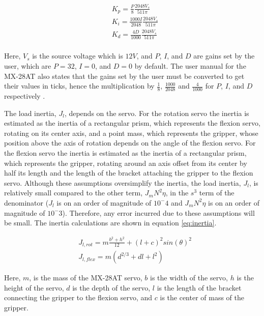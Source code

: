 \documentclass[letterpaper,12pt]{article}
\begin{document}
\begin{equation}
\begin{split}
	\label{eq:internal_gains_conversion}
	& K_p = \frac{P}{8} \frac{2048 V_s}{511 \pi} \\
	& K_i = \frac{1000 I}{2048} \frac{2048 V_s}{511 \pi} \\
	& K_d = \frac{4 D}{1000} \frac{2048 V_s}{511 \pi} \\
\end{split}
\end{equation}

Here, $V_s$ is the source voltage which is $12 V$, and $P$, $I$, and $D$ are gains set by the user, which are $P=32$, $I=0$, and $D=0$ by default. The user manual for the MX-28AT also states that the gains set by the user must be converted to get their values in ticks, hence the multiplication by $\frac{1}{8}$, $\frac{1000}{2048}$ and $\frac{4}{1000}$ for $P$, $I$, and $D$ respectively \cite{robotis}.

The load inertia, $J_l$, depends on the servo. For the rotation servo the inertia is estimated as the inertia of a rectangular prism, which represents the flexion servo, rotating on its center axis, and a point mass, which represents the gripper, whose position above the axis of rotation depends on the angle of the flexion servo. For the flexion servo the inertia is estimated as the inertia of a rectangular prism, which represents the gripper, rotating around an axis offset from its center by half its length and the length of the bracket attaching the gripper to the flexion servo. Although these assumptions oversimplify the inertia, the load inertia, $J_l$, is relatively small compared to the other term, $J_mN^2\eta$, in the $s^3$ term of the denominator ($J_l$ is on an order of magnitude of $10^-4$ and $J_mN^2\eta$ is on an order of magnitude of $10^-3$). Therefore, any error incurred due to these assumptions will be small. The inertia calculations are shown in equation \ref{eq:inertia}.

\begin{equation}
\begin{split}
	\label{eq:inertia}
	& J_{l, rot} = m \frac{b^2 + h^2}{12} + (l + c)^2 sin(\theta)^2 \\
	& J_{l, flex} = m (d^{2/3} + d l + l^2)
\end{split}
\end{equation}

Here, $m$, is the mass of the MX-28AT servo, $b$ is the width of the servo, $h$ is the height of the servo, $d$ is the depth of the servo, $l$ is the length of the bracket connecting the gripper to the flexion servo, and $c$ is the center of mass of the gripper.
\end{document}
